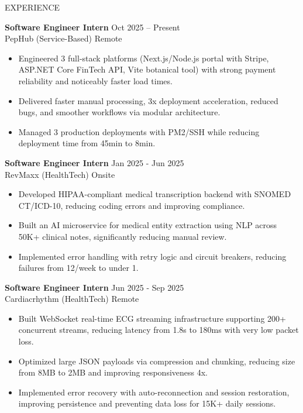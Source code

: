 \documentclass{resume}
\begin{document}
\vspace{-0.3cm}

\begin{rSection}{EXPERIENCE}

{\bf Software Engineer Intern} \hfill {Oct 2025 -- Present} \\
PepHub (Service-Based) \hfill {Remote}
\begin{itemize}
  \item Engineered 3 full-stack platforms (Next.js/Node.js portal with Stripe, ASP.NET Core FinTech API, Vite botanical tool) with strong payment reliability and noticeably faster load times.
  \item Delivered faster manual processing, 3x deployment acceleration, reduced bugs, and smoother workflows via modular architecture.
  \item Managed 3 production deployments with PM2/SSH while reducing deployment time from 45min to 8min.
\end{itemize}


{\bf Software Engineer Intern} \hfill {Jan 2025 - Jun 2025}\\
RevMaxx (HealthTech) \hfill {Onsite}
\begin{itemize}
  \item Developed HIPAA-compliant medical transcription backend with SNOMED CT/ICD-10, reducing coding errors and improving compliance.
  \item Built an AI microservice for medical entity extraction using NLP across 50K+ clinical notes, significantly reducing manual review.
  \item Implemented error handling with retry logic and circuit breakers, reducing failures from 12/week to under 1.
\end{itemize}


{\bf Software Engineer Intern} \hfill {Jun 2025 - Sep 2025}\\
Cardiacrhythm (HealthTech) \hfill {Remote}
\begin{itemize}
  \item Built WebSocket real-time ECG streaming infrastructure supporting 200+ concurrent streams, reducing latency from 1.8s to 180ms with very low packet loss.
  \item Optimized large JSON payloads via compression and chunking, reducing size from 8MB to 2MB and improving responsiveness 4x.
  \item Implemented error recovery with auto-reconnection and session restoration, improving persistence and preventing data loss for 15K+ daily sessions.
\end{itemize}



\end{rSection}
\end{document}
